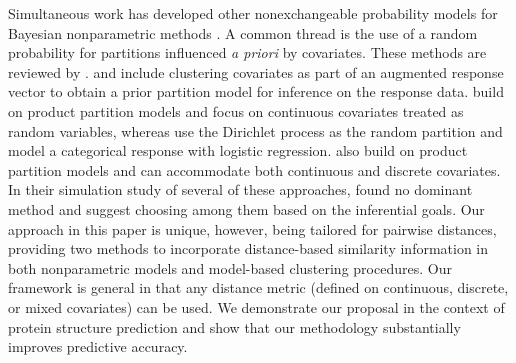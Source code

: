 \documentclass[lineno]{biometrika-dbd}
\begin{document}
Simultaneous work has developed other nonexchangeable probability models for
Bayesian nonparametric methods
\citep[e.g.,][]{park:duns:2007,shah:neal:2007,muel:quin:rosn:2008}. A common
thread is the use of a random probability for partitions influenced \textit{a
priori} by covariates.  These methods are reviewed by \citet{muel:quin:2008}.
\citet{park:duns:2007} and \citet{shah:neal:2007} include clustering covariates
as part of an augmented response vector to obtain a prior partition model for
inference on the response data.  \citet{park:duns:2007} build on product
partition models and focus on continuous covariates treated as random
variables, whereas \citet{shah:neal:2007} use the Dirichlet process as the
random partition and model a categorical response with logistic regression.
\citet{muel:quin:2008} also build on product partition models and can
accommodate both continuous and discrete covariates. In their simulation study
of several of these approaches, \citet{muel:quin:2008} found no dominant method
and suggest choosing among them based on the inferential goals.  Our approach
in this paper is unique, however, being tailored for pairwise distances,
providing two methods to incorporate distance-based similarity information in
both nonparametric models and model-based clustering procedures.  Our framework
is general in that any distance metric (defined on continuous, discrete, or
mixed covariates) can be used.  We demonstrate our proposal in the context of
protein structure prediction and show that our methodology substantially
improves predictive accuracy.

\end{document}

